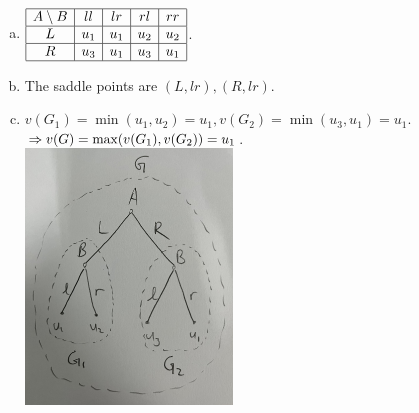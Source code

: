 \begin{pr}$ $
\begin{enumerate}[(a)]
\item $\begin{array}{|c|c|c|c|c|}\hline
A\setminus B&ll&lr&rl&rr\\\hline
L&u_1&u_1&u_2&u_2\\\hline
R&u_3&u_1&u_3&u_1\\\hline
\end{array}$.
\item The saddle points are $(L, lr), (R, lr)$.
\item $v(G_1)=\min(u_1, u_2)=u_1, v(G_2)=\min(u_3, u_1)=u_1$.\\
$\Rightarrow v(G)=\max(v(G_1), v(G_2))=u_1$.\\
\includegraphics[width=5.5cm]{p1.JPG}
\end{enumerate}
\end{pr}
